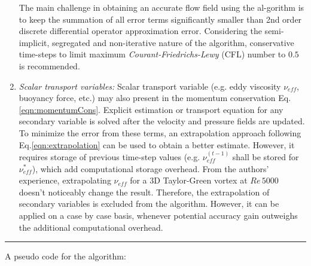 \begin{enumerate}
The main challenge in obtaining an accurate flow field using the \spaece al-gorithm is to keep the summation of all error terms significantly smaller than 2nd order discrete differential operator approximation error. Considering the semi-implicit, segregated and non-iterative nature of the algorithm, conservative time-steps to limit maximum \textit{Courant-Friedrichs-Lewy} (CFL) number to $\mathbf{0.5}$ is recommended. 



\item \textit{Scalar transport variables:} Scalar transport variable (e.g. eddy viscosity $\nu_{eff}$, buoyancy force, etc.) may also present in the momentum conservation Eq. \eqref{eqn:momentumCons}. Explicit estimation or transport equation for any secondary variable is solved after the velocity and pressure fields are updated. To minimize the error from these terms, an extrapolation approach following Eq.\eqref{eqn:extrapolation} can be used to obtain a better estimate. However, it requires storage of previous time-step values (e.g. $\nu_{eff}^{(t-1)}$ shall be stored for $\nu_{eff}^*$), which add computational storage overhead. From the authors' experience, extrapolating $\nu_{eff}$ for a 3D Taylor-Green vortex at $Re \, 5000$ doesn't noticeably change the result. Therefore, the extrapolation of secondary variables is excluded from the algorithm. However, it can be applied on a case by case basis, whenever potential accuracy gain outweighs the additional computational overhead.
 
\end{enumerate} 

\rule{\columnwidth}{1pt}

A pseudo code for the \spaece algorithm:

